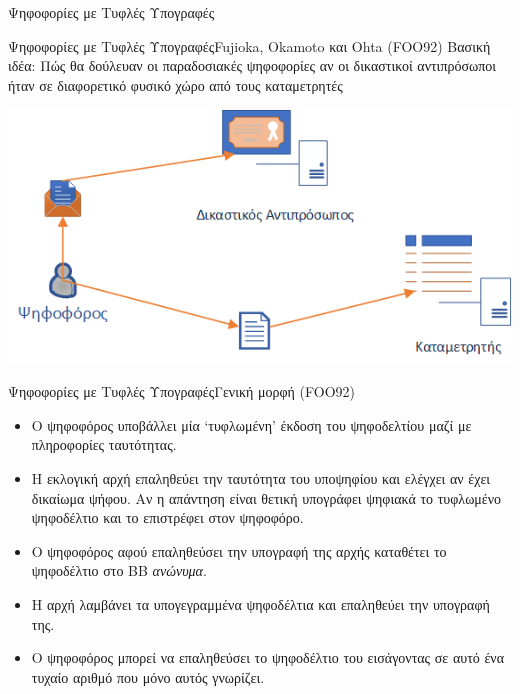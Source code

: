 \documentclass[handout]{beamer}
\begin{document}
\begin{section}{Ψηφοφορίες με Τυφλές Υπογραφές}

\begin{frame}{Ψηφοφορίες με Τυφλές Υπογραφές}{Fujioka, Okamoto και Ohta (FOO92)}
    Βασική ιδέα: Πώς θα δούλευαν οι παραδοσιακές ψηφοφορίες αν οι δικαστικοί αντιπρόσωποι ήταν σε διαφορετικό φυσικό χώρο από τους καταμετρητές
    \begin{center}
        \includegraphics[scale=0.8]{simplefoo.PNG}
    \end{center}
\end{frame}

\begin{frame}{Ψηφοφορίες με Τυφλές Υπογραφές}{Γενική μορφή (FOO92)}
\begin{itemize}
\item Ο ψηφοφόρος υποβάλλει μία `τυφλωμένη' έκδοση του ψηφοδελτίου μαζί με πληροφορίες ταυτότητας.  \pause 
\item Η εκλογική αρχή επαληθεύει την ταυτότητα του υποψηφίου και ελέγχει αν έχει δικαίωμα ψήφου. Αν η απάντηση είναι θετική υπογράφει ψηφιακά το τυφλωμένο ψηφοδέλτιο και το επιστρέφει στον ψηφοφόρο. \pause 
\item Ο ψηφοφόρος αφού επαληθεύσει την υπογραφή της αρχής καταθέτει το ψηφοδέλτιο στο BB \textit{ανώνυμα}.  \pause 
\item Η αρχή λαμβάνει τα υπογεγραμμένα ψηφοδέλτια και επαληθεύει την υπογραφή της. \pause 
\item O ψηφοφόρος μπορεί να επαληθεύσει το ψηφοδέλτιο του εισάγοντας σε αυτό ένα τυχαίο αριθμό που μόνο αυτός γνωρίζει. 
\end{itemize}
\end{frame} 


\end{section}
\end{document}
